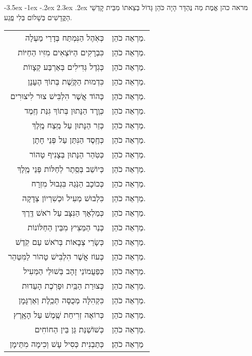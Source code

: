 \documentclass[12pt,letterpaper]{siddur}
\makeatletter
\renewcommand\section{\setcounter{mishnah}{0}\@startsection {section}{1}{\z@}%
                                   {-3.5ex \@plus -1ex \@minus -.2ex}%
                                   {2.3ex \@plus.2ex}%
                                   {\normalfont\large}}
\makeatother
\begin{document}
\section{מראה כהן}
אֱמֶת מַה נֶּהְדָּר הָיָה כֹּהֵן גָּדוֹל בְּצֵאתוֹ מִבֵּית קׇדְשֵׁי הַקֳּדָשִׁים בְּשָׁלוֹם בְּלִי פֶֽגַע.
\begin{longtable}[r]{r l}
כְּאֹֽהֶל הַנִּמְתַּח בְּדָרֵי מַעְלָה&מַרְאֵה כֹהֵן.\\
כִּבְרָקִים הַיּוֹצְאִים מִזִּיו הַחַיּוֹת&מַרְאֵה כֹהֵן.\\
כְּגֹֽדֶל גְּדִילִים בְּאַרְבַּע קְצָווֹת&מַרְאֵה כֹהֵן.\\
כִּדְמוּת הַקֶּֽשֶׁת בְּתוֹךְ הֶעָנָן&מַרְאֵה כֹהֵן.\\
כְּהוֹד אֲשֶׁר הִלְבִּישׁ צוּר לִיצוּרִים&מַרְאֵה כֹהֵן.\\
כְּוֶֽרֶד הַנָּתוּן בְּתוֹךְ גִּנַּת חֶֽמֶד&מַרְאֵה כֹהֵן.\\
כְּזֵר הַנָּתוּן עַל מֵֽצַח מֶֽלֶךְ&מַרְאֵה כֹהֵן.\\
כְּחֶֽסֶד הַנִּתַּן עַל פְּנֵי חָתָן&מַרְאֵה כֹהֵן.\\
כְּטֹֽהַר הַנָּתוּן בְּצָנִיף טָהוֹר&מַרְאֵה כֹהֵן.\\
כְּיוֹשֵׁב בְּסֵֽתֶר לְחַלּוֹת פְּנֵי מֶֽלֶךְ&מַרְאֵה כֹהֵן.\\
כְּכוֹכָב הַנֹּֽגַהּ בִּגְבוּל מִזְרָח&מַרְאֵה כֹהֵן.\\
כִּלְבוּשׁ מְעִיל וּכְשִׁרְיוֹן צְדָקָה&מַרְאֵה כֹהֵן.\\
כְּמַלְאָךְ הַנִּצָּב עַל רֹאשׁ דֶּֽרֶךְ&מַרְאֵה כֹהֵן.\\
כְּנֵר הַמֵּצִיץ מִבֵּין הַחַלּוֹנוֹת&מַרְאֵה כֹהֵן.\\
כְּשָׂרֵי צְבָאוֹת בְּרֹאשׁ עַם קֹֽדֶשׁ&מַרְאֵה כֹהֵן.\\
כְּעוֹז אֲשֶׁר הִלְבִּישׁ טָהוֹר לַמִּטַּהֵר&מַרְאֵה כֹהֵן.\\
כְּפַעֲמוֹנֵי זָהָב בְּשׁוּלֵי הַמְּעִיל&מַרְאֵה כֹהֵן.\\
כְּצוּרַת הַבַּֽיִת וּפָרֹֽכֶת הָעֵדוּת&מַרְאֵה כֹהֵן.\\
כִּקְהִלָּה מְכֻסָּה תְּכֵֽלֶת וְאַרְגָּמָן&מַרְאֵה כֹהֵן.\\
כְּרוֹאֶה זְרִיחַת שֶֽׁמֶשׁ עַל הָאָֽרֶץ&מַרְאֵה כֹהֵן.\\
כְּשׁוֹשַׁנַּת גַּן בֵּין הַחוֹחִים&מַרְאֵה כֹהֵן.\\
כְּתַבְנִית כְּסִיל עָשׁ וְכִימָה מִתֵּימָן&מַרְאֵה כֹהֵן׃
\end{longtable}
\end{document}
